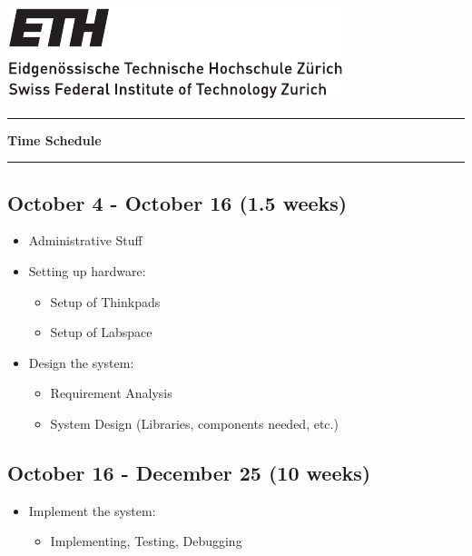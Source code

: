 \documentclass[a4paper, 11pt]{article}
\begin{document}
\includegraphics[scale=1]{../images/ETHlogo_13.pdf}
\vspace{10pt}
\hrule
\vspace{10pt}

\begin{center}
    {\LARGE
    \textbf{\Huge{Time Schedule}}}
\end{center}

\vspace{10pt}
\hrule

\subsection*{October 4 - October 16 (1.5 weeks)}
\begin{itemize}
    \item Administrative Stuff
    \item Setting up hardware: \begin{itemize}
                                \item Setup of Thinkpads
                                \item Setup of Labspace
                               \end{itemize}
    \item Design the system: \begin{itemize}
                                \item Requirement Analysis
                                \item System Design (Libraries, components needed, etc.)
                             \end{itemize}
\end{itemize}

\subsection*{October 16 - December 25 (10 weeks)}
\begin{itemize}
    \item Implement the system: \begin{itemize}
                                \item Implementing, Testing, Debugging
                               \end{itemize}

\end{itemize}
\end{document}
